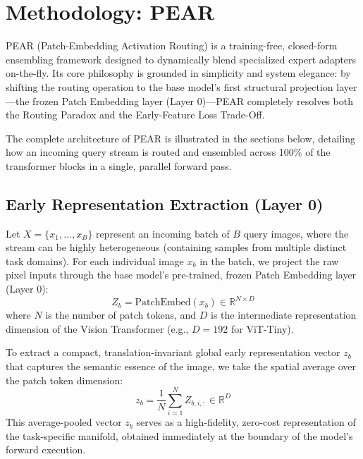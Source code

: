 \section{Methodology: PEAR}
\label{sec:method}

PEAR (Patch-Embedding Activation Routing) is a training-free, closed-form ensembling framework designed to dynamically blend specialized expert adapters on-the-fly. Its core philosophy is grounded in simplicity and system elegance: by shifting the routing operation to the base model's first structural projection layer---the frozen Patch Embedding layer (Layer 0)---PEAR completely resolves both the Routing Paradox and the Early-Feature Loss Trade-Off. 

The complete architecture of PEAR is illustrated in the sections below, detailing how an incoming query stream is routed and ensembled across 100\% of the transformer blocks in a single, parallel forward pass.

\subsection{Early Representation Extraction (Layer 0)}
Let $X = \{x_1, \dots, x_B\}$ represent an incoming batch of $B$ query images, where the stream can be highly heterogeneous (containing samples from multiple distinct task domains). For each individual image $x_b$ in the batch, we project the raw pixel inputs through the base model's pre-trained, frozen Patch Embedding layer (Layer 0):
\begin{equation}
    Z_b = \text{PatchEmbed}(x_b) \in \mathbb{R}^{N \times D}
\end{equation}
where $N$ is the number of patch tokens, and $D$ is the intermediate representation dimension of the Vision Transformer (e.g., $D = 192$ for ViT-Tiny). 

To extract a compact, translation-invariant global early representation vector $z_b$ that captures the semantic essence of the image, we take the spatial average over the patch token dimension:
\begin{equation}
    z_b = \frac{1}{N} \sum_{i=1}^N Z_{b, i, :} \in \mathbb{R}^D
\end{equation}
This average-pooled vector $z_b$ serves as a high-fidelity, zero-cost representation of the task-specific manifold, obtained immediately at the boundary of the model's forward execution.

